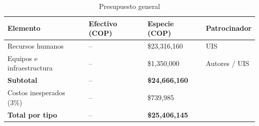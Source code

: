 \documentclass[12pt,onecolumn]{IEEEtran}
\begin{document}
\begin{table}[!ht]
\centering
\caption{Presupuesto general}
\renewcommand{\arraystretch}{1.2}
\setlength{\tabcolsep}{6pt}
\begin{tabular}{|>{\centering\arraybackslash}p{4cm}|
                >{\centering\arraybackslash}p{3cm}|
                >{\centering\arraybackslash}p{3cm}|
                >{\centering\arraybackslash}p{3cm}|}
\hline
\textbf{Elemento} & \textbf{Efectivo (COP)} & \textbf{Especie (COP)} & \textbf{Patrocinador} \\ \hline
Recursos humanos & -- & \$23,316,160 & UIS \\ \hline
Equipos e infraestructura & -- & \$1,350,000 & Autores / UIS \\ \hline
\textbf{Subtotal} & -- & \textbf{\$24,666,160} &  \\ \hline
Costos inesperados (3\%) & -- & \$739,985 &  \\ \hline
\textbf{Total por tipo} & -- & \textbf{\$25,406,145} &  \\ \hline
\end{tabular}
\end{table}

\newpage




\end{document}
